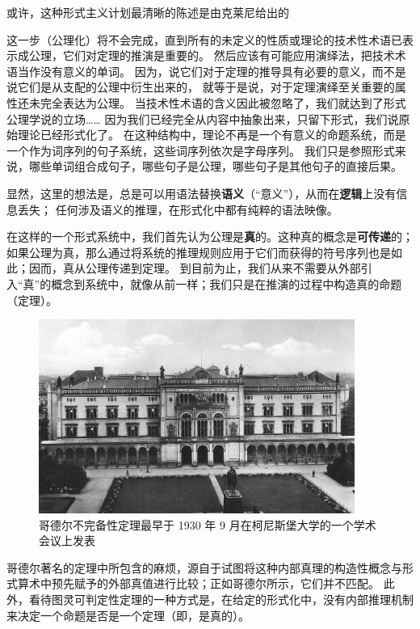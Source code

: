 \documentclass[a4paper,12pt]{article}
\begin{document}
或许，这种形式主义计划最清晰的陈述是由克莱尼给出的\cite{KleeneSC1952}

\begin{displayquote}
这一步（公理化）将不会完成，直到所有的未定义的性质或理论的技术性术语已表示成公理，它们对定理的推演是重要的。
然后应该有可能应用演绎法，把技术术语当作没有意义的单词。
因为，说它们对于定理的推导具有必要的意义，而不是说它们是从支配的公理中衍生出来的，
就等于是说，对于定理演绎至关重要的属性还未完全表达为公理。
当技术性术语的含义因此被忽略了，我们就达到了形式公理学说的立场……
因为我们已经完全从内容中抽象出来，只留下形式，我们说原始理论已经形式化了。
在这种结构中，理论不再是一个有意义的命题系统，而是一个作为词序列的句子系统，这些词序列依次是字母序列。
我们只是参照形式来说，哪些单词组合成句子，哪些句子是公理，哪些句子是其他句子的直接后果。
\end{displayquote}

显然，这里的想法是，总是可以用语法替换\textbf{语义}（“意义”），从而在\textbf{逻辑}上没有信息丢失；
任何涉及语义的推理，在形式化中都有纯粹的语法映像。

在这样的一个形式系统中，我们首先认为公理是\textbf{真}的。这种真的概念是\textbf{可传递}的；
如果公理为真，那么通过将系统的推理规则应用于它们而获得的符号序列也是如此；因而，真从公理传递到定理。
到目前为止，我们从来不需要从外部引入“真”的概念到系统中，就像从前一样；我们只是在推演的过程中构造真的命题（定理）。

\begin{figure}[ht]
\centering
\includegraphics[height=2.5in]{images/konigsberger_university.jpg}
\caption{哥德尔不完备性定理最早于 1930 年 9 月在柯尼斯堡大学的一个学术会议上发表}
\end{figure}

哥德尔著名的定理\cite{GodelK1931}中所包含的麻烦，源自于试图将这种内部真理的构造性概念与形式算术中预先赋予的外部真值进行比较；正如哥德尔所示，它们并不匹配。
此外，看待图灵可判定性定理\cite{TuringA1937}的一种方式是，在给定的形式化中，没有内部推理机制来决定一个命题是否是一个定理（即，是真的）。
\end{document}

